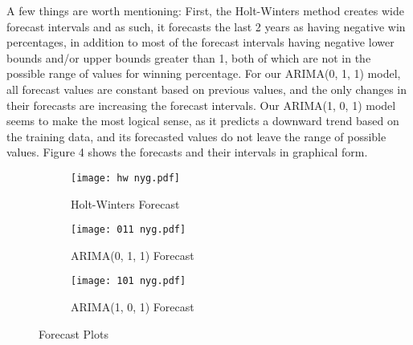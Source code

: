 \documentclass[12pt]{article}
\begin{document}
A few things are worth mentioning: First, the Holt-Winters method creates wide forecast intervals and as such, it forecasts the last 2 years as having negative win percentages, in addition to most of the forecast intervals having negative lower bounds and/or upper bounds greater than 1, both of which are not in the possible range of values for winning percentage. For our ARIMA(0, 1, 1) model, all forecast values are constant based on previous values, and the only changes in their forecasts are increasing the forecast intervals. Our ARIMA(1, 0, 1) model seems to make the most logical sense, as it predicts a downward trend based on the training data, and its forecasted values do not leave the range of possible values. Figure 4 shows the forecasts and their intervals in graphical form.\\
\begin{figure}[h]
\begin{subfigure}{0.32\textwidth}
\texttt{[image: hw nyg.pdf]} 
\caption{Holt-Winters Forecast}
\label{fig:subim1}
\end{subfigure}
\begin{subfigure}{0.32\textwidth}
\texttt{[image: 011 nyg.pdf]}
\caption{ARIMA(0, 1, 1) Forecast}
\label{fig:subim2}
\end{subfigure}
\begin{subfigure}{0.32\textwidth}
\texttt{[image: 101 nyg.pdf]} 
\caption{ARIMA(1, 0, 1) Forecast}
\label{fig:subim3}
\end{subfigure}
\caption{Forecast Plots}
\label{fig:Figure 4}
\end{figure}\\

\newpage
\end{document}
